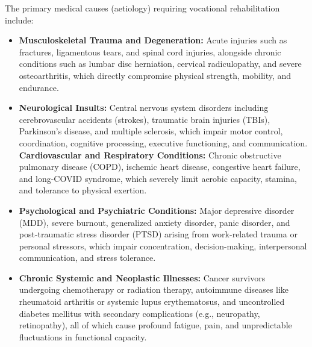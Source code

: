 The primary medical causes (aetiology) requiring vocational rehabilitation include:
\begin{itemize}
    \item \textbf{Musculoskeletal Trauma and Degeneration:} Acute injuries such as fractures, ligamentous tears, and spinal cord injuries, alongside chronic conditions such as lumbar disc herniation, cervical radiculopathy, and severe osteoarthritis, which directly compromise physical strength, mobility, and endurance.
    \item \textbf{Neurological Insults:} Central nervous system disorders including cerebrovascular accidents (strokes), traumatic brain injuries (TBIs), Parkinson's disease, and multiple sclerosis, which impair motor control, coordination, cognitive processing, executive functioning, and communication.
    \textbf{Cardiovascular and Respiratory Conditions:} Chronic obstructive pulmonary disease (COPD), ischemic heart disease, congestive heart failure, and long-COVID syndrome, which severely limit aerobic capacity, stamina, and tolerance to physical exertion.
    \item \textbf{Psychological and Psychiatric Conditions:} Major depressive disorder (MDD), severe burnout, generalized anxiety disorder, panic disorder, and post-traumatic stress disorder (PTSD) arising from work-related trauma or personal stressors, which impair concentration, decision-making, interpersonal communication, and stress tolerance.
    \item \textbf{Chronic Systemic and Neoplastic Illnesses:} Cancer survivors undergoing chemotherapy or radiation therapy, autoimmune diseases like rheumatoid arthritis or systemic lupus erythematosus, and uncontrolled diabetes mellitus with secondary complications (e.g., neuropathy, retinopathy), all of which cause profound fatigue, pain, and unpredictable fluctuations in functional capacity.
\end{itemize}

